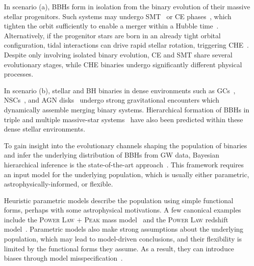 \begin{refsection}
In scenario (a), \acp{BBH} form in isolation from the binary evolution of their massive stellar progenitors. Such systems may undergo \ac{SMT}~\citep{vandenHeuvel:2017pwp,Neijssel:2019irh,Gallegos-Garcia:2021hti,Briel:2022cfl} or \ac{CE} phases~\citep{1976IAUS...73.....E,Paczynski_1976,Tutukov:1993bse,Bethe:1998bn,2002ApJ...572..407B,Stevenson:2017tfq,Giacobbo:2018etu,Dominik:2012kk,Ivanova:2012vx,Bavera:2020uch}, which tighten the orbit sufficiently to enable a merger within a Hubble time~\citep{Peters:1964zz,Zevin:2020gbd}. Alternatively, if the progenitor stars are born in an already tight orbital configuration, tidal interactions can drive rapid stellar rotation, triggering \ac{CHE}~\citep{deMink:2009jq,Mandel:2015qlu, deMink:2016vkw, Marchant:2016wow,duBuisson:2020asn}. Despite only involving isolated binary evolution, \ac{CE} and \ac{SMT} share several evolutionary stages, while \ac{CHE} binaries undergo significantly different physical processes.

In scenario (b), stellar and BH binaries in dense environments such as \acp{GC}~\citep{Sigurdsson:1993zrm,Sigurdsson:1993tui,PortegiesZwart:1999nm,Miller:2002pg,Lightman:1978zz,Hut:1992wz,Fregeau:2006es,OLeary:2005vqo,Downing:2009ag,Rodriguez:2015oxa,Rodriguez:2016kxx,Rodriguez:2019huv,Askar:2016jwt}, \acp{NSC}~\citep{PortegiesZwart:1999nm,Miller:2008yw,Banerjee:2009hs,Rodriguez:2019huv,Zahn:1977mi}, and \ac{AGN} disks~\citep{Antonini:2016gqe,Mckernan:2017ssq,McKernan:2019beu,Stone:2016wzz,Tagawa:2019osr,Tagawa:2021ofj,Bartos_2017,Yang:2020lhq} undergo strong gravitational encounters which dynamically assemble merging binary systems. Hierarchical formation of \acp{BBH} in triple and multiple massive-star systems~\citep{Sana_2014,Silsbee:2016djf,Rodriguez:2018jqu,Gupta:2019unn,Toonen_2020} have also been predicted within these dense stellar environments.

To gain insight into the evolutionary channels shaping the population of binaries and infer the underlying distribution of \acp{BBH} from \ac{GW} data, Bayesian hierarchical inference is the state-of-the-art approach~\citep{Vitale:2020aaz,Thrane:2018qnx,Callister:2024cdx,LIGOScientific:2018jsj,LIGOScientific:2020kqk,KAGRA:2021duu}. This framework requires an input model for the underlying population, which is usually either parametric, astrophysically-informed, or flexible.

Heuristic parametric models describe the population using simple functional forms, perhaps with some astrophysical motivations. A few canonical examples include the \textsc{Power Law + Peak} mass model~\citep{Talbot:2018cva} and the \textsc{Power Law} redshift model~\citep{Fishbach:2018edt}. Parametric models also make strong assumptions about the underlying population, which may lead to model-driven conclusions, and their flexibility is limited by the functional forms they assume. As a result, they can introduce biases through model misspecification~\citep{Romero-Shaw:2022ctb,Cheng:2023ddt}.


\end{refsection}
